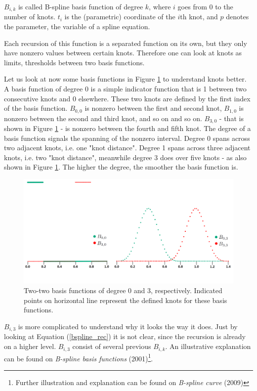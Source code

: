 \documentclass{article}
\begin{document}
$B_{i,k}$ is called B-spline basis function of degree $k$, where $i$ goes from 0 to the number of knots. $t_i$ is the (parametric) coordinate of the $i$th knot, and $p$ denotes the parameter, the variable of a spline equation.

Each recursion of this function is a separated function on its own, but they only have nonzero values between certain knots. Therefore one can look at knots as limits, thresholds between two basis functions.

Let us look at now some basis functions in Figure \ref{basisfunctions} to understand knots better. A basis function of degree 0 is a simple indicator function that is 1 between two consecutive knots and 0 elsewhere. These two knots are defined by the first index of the basis function. $B_{0,0}$ is nonzero between the first and second knot, $B_{1,0}$ is nonzero between the second and third knot, and so on and so on. $B_{3,0}$ - that is shown in Figure \ref{basisfunctions} - is nonzero between the fourth and fifth knot. The degree of a basis function signals the spanning of the nonzero interval. Degree 0 spans across two adjacent knots, i.e. one "knot distance". Degree 1 spans across three adjacent knots, i.e. two "knot distance", meanwhile degree 3 does over five knots - as also shown in Figure \ref{basisfunctions}. The higher the degree, the smoother the basis function is.

\begin{figure}[H]
\centering
\includegraphics[width=\textwidth]{basisfunctions}
\caption{Two-two basis functions of degree 0 and 3, respectively. Indicated points on horizontal line represent the defined knots for these basis functions.}
\label{basisfunctions}
\end{figure}

$B_{i,3}$ is more complicated to understand why it looks the way it does. Just by looking at Equation (\ref{bspline_rec}) it is not clear, since the recursion is already on a higher level. $B_{i,3}$ consist of several previous $B_{i, k}$. An illustrative explanation can be found on \emph{B-spline basis functions} (2001)\footnote{Further illustration and explanation can be found on \emph{B-spline curve} (2009)}.
\end{document}
